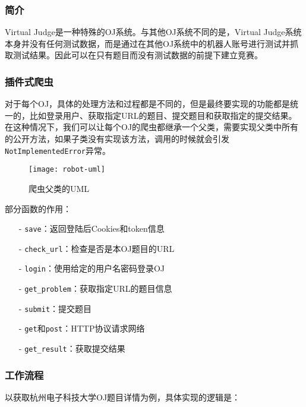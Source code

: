 \subsubsection{简介}

Virtual Judge是一种特殊的OJ系统。与其他OJ系统不同的是，Virtual Judge系统本身并没有任何测试数据，而是通过在其他OJ系统中的机器人账号进行测试并抓取测试结果。因此可以在只有题目而没有测试数据的前提下建立竞赛。\cite{wiki-vj}

\subsubsection{插件式爬虫}

对于每个OJ，具体的处理方法和过程都是不同的，但是最终要实现的功能都是统一的，比如登录用户、获取指定URL的题目、提交题目和获取指定的提交结果。在这种情况下，我们可以让每个OJ的爬虫都继承一个父类，需要实现父类中所有的公开方法，如果子类没有实现该方法，调用的时候就会引发\texttt{NotImplementedError}异常。

\begin{figure}[H]
\centering
\texttt{[image: robot-uml]}
\caption{爬虫父类的UML}
\end{figure}

部分函数的作用：
\begin{itemize}
    \item[-] \texttt{save}：返回登陆后Cookies和token信息
    \item[-] \texttt{check\_url}：检查是否是本OJ题目的URL
    \item[-] \texttt{login}：使用给定的用户名密码登录OJ
    \item[-] \texttt{get\_problem}：获取指定URL的题目信息
    \item[-] \texttt{submit}：提交题目
    \item[-] \texttt{get}和\texttt{post}：HTTP协议请求网络
    \item[-] \texttt{get\_result}：获取提交结果
\end{itemize}

\subsubsection{工作流程}

以获取杭州电子科技大学OJ题目详情为例，具体实现的逻辑是：

